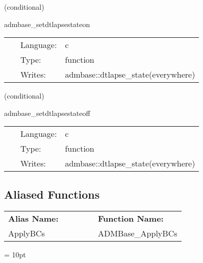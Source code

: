 \documentclass{article}
\begin{document}
\vspace{5mm}

   (conditional) 

\hspace{5mm} admbase\_setdtlapsestateon 

\hspace{5mm}{\it set the dtlapse\_state variable to 1 } 


\hspace{5mm}

 \begin{tabular*}{160mm}{cll} 
~ & Language:  & c \\ 
~ & Type:  & function \\ 
~ & Writes:  & admbase::dtlapse\_state(everywhere) \\ 
\end{tabular*} 


\vspace{5mm}

   (conditional) 

\hspace{5mm} admbase\_setdtlapsestateoff 

\hspace{5mm}{\it set the dtlapse\_state variable to 0 } 


\hspace{5mm}

 \begin{tabular*}{160mm}{cll} 
~ & Language:  & c \\ 
~ & Type:  & function \\ 
~ & Writes:  & admbase::dtlapse\_state(everywhere) \\ 
\end{tabular*} 


\subsection*{Aliased Functions}

\hspace{5mm}

 \begin{tabular*}{160mm}{ll} 

{\bf Alias Name:} ~~~~~~~ & {\bf Function Name:} \\ 
ApplyBCs & ADMBase\_ApplyBCs \\ 
\end{tabular*} 



\vspace{5mm}\parskip = 10pt 
\end{document}
